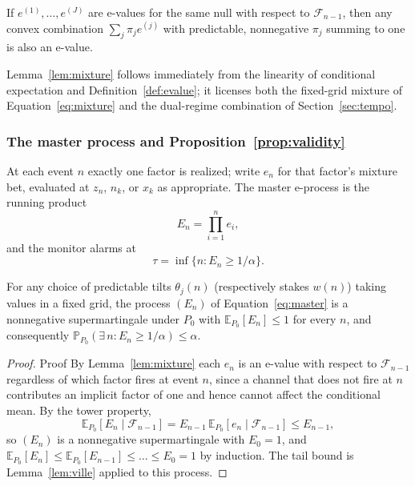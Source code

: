 \documentclass[trsc,dblanonrev]{informs4}
\newcommand{\E}{\mathbb{E}}
\newcommand{\Prob}{\mathbb{P}}
\newcommand{\F}{\mathcal{F}}
\begin{document}
\begin{lemma}\label{lem:mixture}
If $e^{(1)}, \dots, e^{(J)}$ are e-values for the same null with
respect to $\F_{n-1}$, then any convex combination
$\sum_j \pi_j e^{(j)}$ with predictable, nonnegative $\pi_j$ summing to
one is also an e-value.
\end{lemma}

Lemma~\ref{lem:mixture} follows immediately from the linearity of
conditional expectation and Definition~\ref{def:evalue}; it licenses
both the fixed-grid mixture of Equation~\eqref{eq:mixture} and the
dual-regime combination of Section~\ref{sec:tempo}.

\subsubsection{The master process and Proposition~\ref{prop:validity}}

At each event $n$ exactly one factor is realized; write $e_n$ for that
factor's mixture bet, evaluated at $z_n$, $n_k$, or $x_k$ as
appropriate. The master e-process is the running product
\begin{equation}\label{eq:master}
E_n = \prod_{i=1}^n e_i,
\end{equation}
and the monitor alarms at
\begin{equation}\label{eq:alarm}
\tau = \inf\{n : E_n \ge 1/\alpha\}.
\end{equation}

\begin{proposition}\label{prop:validity}
For any choice of predictable tilts $\theta_j(n)$ (respectively stakes
$w(n)$) taking values in a fixed grid, the process $(E_n)$ of
Equation~\eqref{eq:master} is a nonnegative supermartingale under $P_0$
with $\E_{P_0}[E_n] \le 1$ for every $n$, and consequently
$\Prob_{P_0}(\exists\, n : E_n \ge 1/\alpha) \le \alpha$.
\end{proposition}

\begin{proof}{Proof}
By Lemma~\ref{lem:mixture} each $e_n$ is an e-value with respect to
$\F_{n-1}$ regardless of which factor fires at event $n$, since a
channel that does not fire at $n$ contributes an implicit factor of
one and hence cannot affect the conditional mean. By the tower
property,
\[
\E_{P_0}[E_n \mid \F_{n-1}] = E_{n-1}\, \E_{P_0}[e_n \mid \F_{n-1}] \le
E_{n-1},
\]
so $(E_n)$ is a nonnegative supermartingale with $E_0 = 1$, and
$\E_{P_0}[E_n] \le \E_{P_0}[E_{n-1}] \le \dots \le E_0 = 1$ by
induction. The tail bound is Lemma~\ref{lem:ville} applied to this
process. \Halmos
\end{proof}
\end{document}
